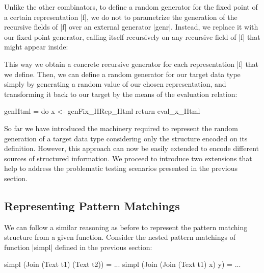 

Unlike the other combinators, to define a random generator for the fixed point
of a certain representation |f|, we do not to parametrize the generation of the
recursive fields of |f| over an external generator |genr|.
%
Instead, we replace it with our fixed point generator, calling itself
recursively on any recursive field of |f| that might appear inside:


This way we obtain a concrete recursive generator for each representation |f|
that we define.
%
Then, we can define a random generator for our target data type simply by
generating a random value of our chosen representation, and transforming it back
to our target by the means of the evaluation relation:

\begin{code}
  genHtml = do  x <- genFix_HRep_Html
                return eval_x_Html
\end{code} %


So far we have introduced the machinery required to represent the random
generation of a target data type considering only the structure encoded on its
definition.
%
However, this approach can now be easily extended to encode different sources of
structured information.
%
We proceed to introduce two extensions that help to address the problematic
testing scenarios presented in the previous section.


\subsection*{\textbf{Representing Pattern Matchings}}

We can follow a similar reasoning as before to represent the pattern matching
structure from a given function.
%
Consider the nested pattern matchings of function |simpl| defined in the
previous section:

\begin{code}
simpl (Join (Text t1) (Text t2))   = ...
simpl (Join (Join (Text t1) x) y)  = ...
\end{code}

